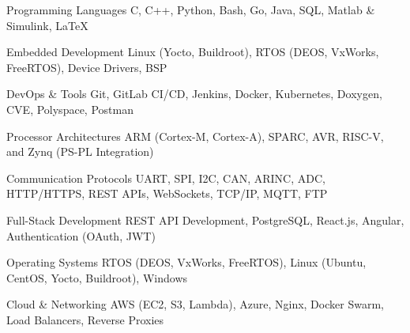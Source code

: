 
\begin{cvskills}

  \cvskill
    {Programming Languages} %
        {\large C, C++, Python, Bash, Go, Java, SQL, Matlab \& Simulink, LaTeX} %

  \cvskill
    {Embedded Development} %
	{\large Linux (Yocto, Buildroot), RTOS (DEOS, VxWorks, FreeRTOS), Device Drivers, BSP} %

  \cvskill
    {DevOps \& Tools} %
    {\large Git, GitLab CI/CD, Jenkins, Docker, Kubernetes, Doxygen, CVE, Polyspace, Postman} %

  \cvskill
    {Processor Architectures} %
    {\large ARM (Cortex-M, Cortex-A), SPARC, AVR, RISC-V, and Zynq (PS-PL Integration)} %

  \cvskill
    {Communication Protocols} %
    {\large UART, SPI, I2C, CAN, ARINC, ADC, HTTP/HTTPS, REST APIs, WebSockets, TCP/IP, MQTT, FTP} %

  \cvskill
    {Full-Stack Development} %
    {\large REST API Development, PostgreSQL, React.js, Angular, Authentication (OAuth, JWT)} %

  \cvskill
    {Operating Systems} %
    {\large RTOS (DEOS, VxWorks, FreeRTOS), Linux (Ubuntu, CentOS, Yocto, Buildroot), Windows} %

  \cvskill
    {Cloud \& Networking} %
    {\large AWS (EC2, S3, Lambda), Azure, Nginx, Docker Swarm, Load Balancers, Reverse Proxies} %

\end{cvskills}

